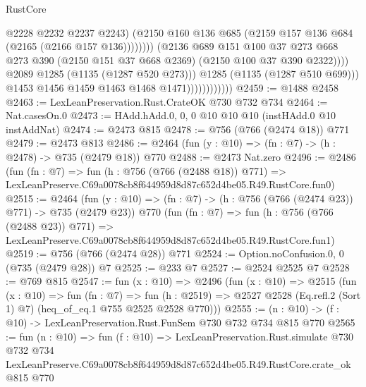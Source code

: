 \begin{lexlean}{RustCore}
\begin{coremodule}
                                              @2228
                                              @2232
                                              @2237
                                              @2243)
                                            (@2150
                                              @160
                                              @136
                                              @685
                                              (@2159 @157 @136 @684 (@2165 (@2166 @157 @136))))))))
                                    (@2136
                                      @689
                                      @151
                                      @100
                                      @37
                                      @273
                                      @668
                                      @273
                                      @390
                                      (@2150 @151 @37 @668 @2369)
                                      (@2150 @100 @37 @390 @2322))))
                                @2089
                                @1285
                                (@1135 (@1287 @520 @273)))
                              @1285
                              (@1135 (@1287 @510 @699)))
                            @1453
                            @1456
                            @1459
                            @1463
                            @1468
                            @1471))))))))))))
@2459 := @1488 @2458
@2463 := LexLeanPreservation.Rust.CrateOK @730 @732 @734
@2464 := Nat.casesOn.{0}
@2473 := HAdd.hAdd.{0, 0, 0} @10 @10 @10 (instHAdd.{0} @10 instAddNat)
@2474 := @2473 @815
@2478 := @756 (@766 (@2474 @18)) @771
@2479 := @2473 @813
@2486 := @2464 (fun (y : @10) => (fn : @7) -> (h : @2478) -> @735 (@2479 @18)) @770
@2488 := @2473 Nat.zero
@2496 := @2486
    (fun (fn : @7) =>
    fun (h : @756 (@766 (@2488 @18)) @771) =>
    LexLeanPreserve.C69a0078cb8f644959d8d87c652d4be05.R49.RustCore.fun0)
@2515 := @2464
    (fun (y : @10) => (fn : @7) -> (h : @756 (@766 (@2474 @23)) @771) -> @735 (@2479 @23))
    @770
    (fun (fn : @7) =>
    fun (h : @756 (@766 (@2488 @23)) @771) =>
    LexLeanPreserve.C69a0078cb8f644959d8d87c652d4be05.R49.RustCore.fun1)
@2519 := @756 (@766 (@2474 @28)) @771
@2524 := Option.noConfusion.{0, 0} (@735 (@2479 @28)) @7
@2525 := @233 @7
@2527 := @2524 @2525 @7
@2528 := @769 @815
@2547 := fun (x : @10) =>
  @2496
    (fun (x : @10) =>
    @2515
      (fun (x : @10) =>
      fun (fn : @7) =>
      fun (h : @2519) =>
      @2527 @2528 (Eq.refl.{2} (Sort 1) @7) (heq_of_eq.{1} @755 @2525 @2528 @770)))
@2555 := (n : @10) -> (f : @10) -> LexLeanPreservation.Rust.FunSem @730 @732 @734 @815 @770
@2565 := fun (n : @10) =>
  fun (f : @10) =>
  LexLeanPreservation.Rust.simulate
    @730
    @732
    @734
    LexLeanPreserve.C69a0078cb8f644959d8d87c652d4be05.R49.RustCore.crate_ok
    @815
    @770
\end{coremodule}
\end{lexlean}
